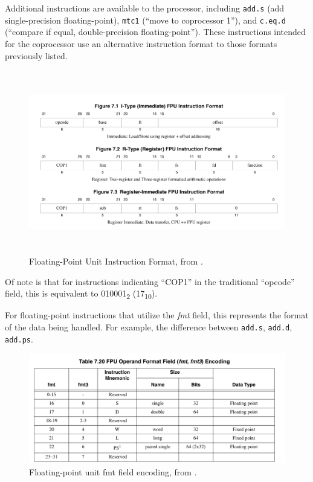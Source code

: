 \documentclass[
    paper=letter,
    parskip=half,
    fontsize=12pt,
    titlepage=firstiscover,
    toc=bibliography,
    numbers=endperiod
]{scrartcl}
\begin{document}
Additional instructions are available to the processor, including
\texttt{add.s} (add single-precision floating-point), \texttt{mtc1}
(``move to coprocessor 1''), and \texttt{c.eq.d} (``compare if equal,
double-precision floating-point''). These instructions intended for the
coprocessor use an alternative instruction format to those formats
previously listed.

\begin{figure}[H]
    \includegraphics[height=8cm]{fpu-instruction-formats}
    \caption{Floating-Point Unit Instruction Format, from \protect\cite{mips-specification}.}
\end{figure}

Of note is that for instructions indicating ``COP1'' in the traditional
``opcode'' field, this is equivalent to 010001\textsubscript{2}
(17\textsubscript{10}).

For floating-point instructions that utilize the \emph{fmt} field, this
represents the format of the data being handled. For example, the
difference between \texttt{add.s}, \texttt{add.d}, \texttt{add.ps}.

\begin{figure}[H]
    \includegraphics[width=\textwidth]{fpu-fmt-encoding}
    \caption{Floating-point unit fmt field encoding, from \protect\cite[Table~7.20]{mips-specification}.}
\end{figure}
\end{document}
